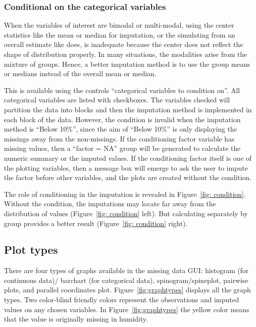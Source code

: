 \documentclass[article]{jss}
\begin{document}
\subsubsection{Conditional on the categorical variables}

When the variables of interest are bimodal or multi-modal, using the center statistics like the mean or median for imputation, or the simulating from an overall estimate like  does, is inadequate because the center does not reflect the shape of distribution properly. In many situations, the modalities arise from the mixture of groups. Hence, a better imputation method is to use the group means or medians instead of the overall mean or median.

This is available using the controls ``categorical variables to condition on''. All categorical variables are listed with checkboxes. The variables checked will partition the data into blocks and then the imputation method is implemented in each block of the data. However, the condition is invalid when the imputation method is ``Below 10\%'', since the aim of ``Below 10\%'' is only displaying the missings away from the non-missings. If the conditioning factor variable has missing values, then a ``factor = NA'' group will be generated to calculate the numeric summary or the imputed values. If the conditioning factor itself is one of the plotting variables, then a message box will emerge to ask the user to impute the factor before other variables, and the plots are created without the condition.

The role of conditioning in the imputation is revealed in Figure~\ref{fig: condition}. Without the condition, the imputations may locate far away from the distribution of values (Figure~\ref{fig: condition} left). But calculating separately by group provides a better result (Figure~\ref{fig: condition} right).


\subsection{Plot types}\label{plottype}

There are four types of graphs available in the missing data GUI: histogram (for continuous data)/ barchart (for categorical data), spinogram/spineplot, pairwise plots, and parallel coordinates plot. Figure~\ref{fig:graphtypes} displays all the graph types. Two color-blind friendly colors represent the observations and imputed values on any chosen variables. In Figure~\ref{fig:graphtypes} the yellow color means that the value is originally missing in humidity.
\end{document}
